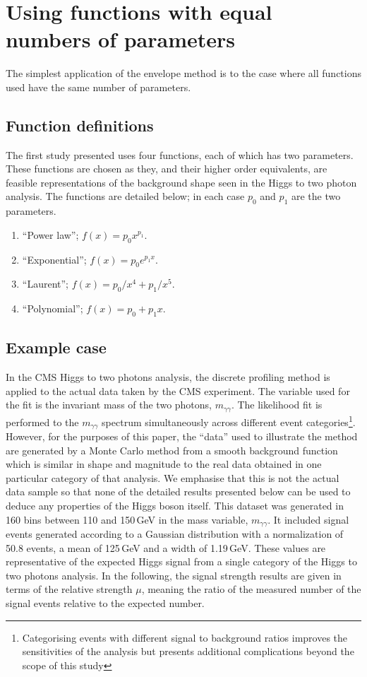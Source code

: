 \section{Using functions with equal numbers of parameters} %
\label{sec:functions}

The simplest application of the envelope method is to the case where all
functions used have the same number of parameters.

\subsection{Function definitions}
\label{sec:functions:function}

The first study presented uses four functions, each of which has two parameters.
These functions are chosen as they, and their higher order equivalents,
are feasible representations of the background shape seen in the Higgs to two photon
analysis. The functions are detailed below; in each case $p_0$ and $p_1$ are
the two parameters.
\begin{enumerate}
\item
``Power law''; $f(x) = p_0 x^{p_1}$.
\item
``Exponential''; $f(x) = p_0 e^{p_1x}$.
\item
``Laurent''; $f(x) = p_0/x^4 + p_1/x^5$.
\item
``Polynomial''; $f(x) = p_0 + p_1 x$.
\end{enumerate}

\subsection{Example case}
\label{sec:functions:example}

In the CMS Higgs to two photons analysis, the discrete profiling method is applied to
the actual data taken by the CMS experiment. The variable used for the fit is the invariant mass of the two photons, $m_{\gamma\gamma}$.
The likelihood fit is performed to the $m_{\gamma\gamma}$ spectrum simultaneously
across different event categories\footnote{Categorising events with different signal to background ratios improves the sensitivities 
of the analysis but presents additional complications beyond the scope of this study}.
However, for the purposes of this
paper, the ``data'' used to illustrate the method are generated by a Monte Carlo
method from a smooth background
function which is similar in shape and magnitude to the
real data obtained in one particular category of that analysis. We emphasise that this is not the
actual data sample so that none of the detailed results presented below can be used to deduce any
properties of the Higgs boson itself.
This dataset was generated in 160 bins between 110 and 150\,GeV in
the mass variable, $m_{\gamma\gamma}$.
It included signal events
generated according to a Gaussian distribution with a normalization of 50.8 events, a mean of 125\,GeV and a
width of 1.19\,GeV. These values are representative of the expected Higgs signal from a single category of the 
Higgs to two photons analysis.
In the following, the signal strength results are given in
terms of the relative strength $\mu$,
meaning the ratio of the measured number of the signal events relative
to the expected number.

